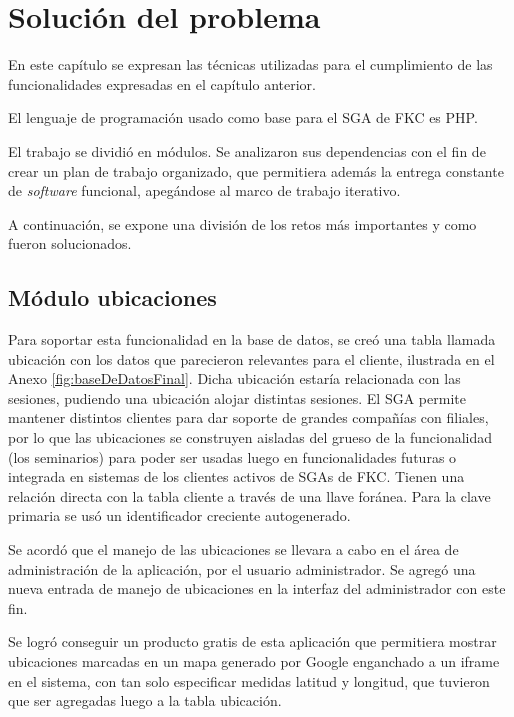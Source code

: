 \chapter{Solución del problema}
\thispagestyle{empty} %

En este capítulo se expresan las técnicas utilizadas para el cumplimiento de las funcionalidades expresadas en el capítulo anterior.

El lenguaje de programación usado como base para el \gls{SGA} de \gls{FKC} es \gls{PHP}.

El trabajo se dividió en módulos. Se analizaron sus dependencias con el fin de crear un plan de trabajo organizado, que permitiera además la entrega constante de \emph{software} funcional, apegándose al marco de trabajo iterativo.

A continuación, se expone una división de los retos más importantes y como fueron solucionados.

	\section{Módulo ubicaciones} %
	\label{sec:ubicaciones}
	
	Para soportar esta funcionalidad en la base de datos, se creó una tabla llamada ubicación con los datos que parecieron relevantes para el cliente, ilustrada en el Anexo \ref{fig:baseDeDatosFinal}. Dicha ubicación estaría relacionada con las sesiones, pudiendo una ubicación alojar distintas sesiones. El SGA permite mantener distintos clientes para dar soporte de grandes compañías con filiales, por lo que las ubicaciones se construyen aisladas del grueso de la funcionalidad (los seminarios) para poder ser usadas luego en funcionalidades futuras o integrada en sistemas de los clientes activos de SGAs de \gls{FKC}. Tienen una relación directa con la tabla cliente a través de una llave foránea. Para la clave primaria se usó un identificador creciente autogenerado.

	Se acordó que el manejo de las ubicaciones se llevara a cabo en el área de administración de la aplicación, por el usuario administrador. Se agregó una nueva entrada de manejo de ubicaciones en la interfaz del administrador con este fin.

	Se logró conseguir un producto gratis de esta aplicación que permitiera mostrar ubicaciones marcadas en un mapa generado por Google enganchado a un iframe en el sistema, con tan solo especificar medidas latitud y longitud, que tuvieron que ser agregadas luego a la tabla ubicación.

